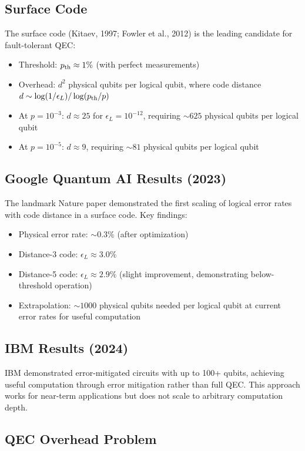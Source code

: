\documentclass[11pt,letterpaper]{article}
\begin{document}
\subsection{Surface Code}

The surface code (Kitaev, 1997; Fowler et al., 2012) is the leading
candidate for fault-tolerant QEC:
\begin{itemize}
\item Threshold: $p_{\rm th} \approx 1\%$ (with perfect measurements)
\item Overhead: $d^2$ physical qubits per logical qubit, where code
distance $d \sim \log(1/\epsilon_L)/\log(p_{\rm th}/p)$
\item At $p = 10^{-3}$: $d \approx 25$ for $\epsilon_L = 10^{-12}$,
requiring $\sim 625$ physical qubits per logical qubit
\item At $p = 10^{-5}$: $d \approx 9$, requiring $\sim 81$ physical
qubits per logical qubit
\end{itemize}

\subsection{Google Quantum AI Results (2023)}

The landmark Nature paper demonstrated the first scaling of logical error
rates with code distance in a surface code. Key findings:
\begin{itemize}
\item Physical error rate: $\sim 0.3\%$ (after optimization)
\item Distance-3 code: $\epsilon_L \approx 3.0\%$
\item Distance-5 code: $\epsilon_L \approx 2.9\%$ (slight improvement,
demonstrating below-threshold operation)
\item Extrapolation: $\sim 1000$ physical qubits needed per logical qubit
at current error rates for useful computation
\end{itemize}

\subsection{IBM Results (2024)}

IBM demonstrated error-mitigated circuits with up to 100+ qubits,
achieving useful computation through error mitigation rather than full
QEC. This approach works for near-term applications but does not scale
to arbitrary computation depth.

\subsection{QEC Overhead Problem}
\end{document}
